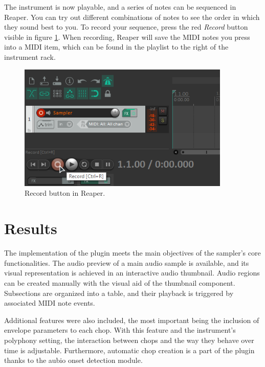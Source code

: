 \documentclass[12pt, a4paper, hidelinks]{article}
\begin{document}
	The instrument is now playable, and a series of notes can be sequenced in Reaper. You can try out different combinations of notes to see the order in which they sound best to you. To record your sequence, press the red \textit{Record} button visible in figure \ref{fig:rec}. When recording, Reaper will save the MIDI notes you press into a MIDI item, which can be found in the playlist to the right of the instrument rack. \par
	

	\begin{figure}[h!]
		\centering
		\includegraphics[width=0.9\textwidth]{u/rec.png}
		\caption{Record button in Reaper.}
		\label{fig:rec}
	\end{figure}
			
	\newpage
	\section{Results}
	The implementation of the plugin meets the main objectives of the sampler's core functionalities. The audio preview of a main audio sample is available, and its visual representation is achieved in an interactive audio thumbnail. Audio regions can be created manually with the visual aid of the thumbnail component. Subsections are organized into a table, and their playback is triggered by associated MIDI note events. \par 
	Additional features were also included, the most important being the inclusion of envelope parameters to each chop. With this feature and the instrument's polyphony setting, the interaction between chops and the way they behave over time is adjustable. Furthermore, automatic chop creation is a part of the plugin thanks to the aubio onset detection module\cite{aubioonset}.\par
	
\end{document}
